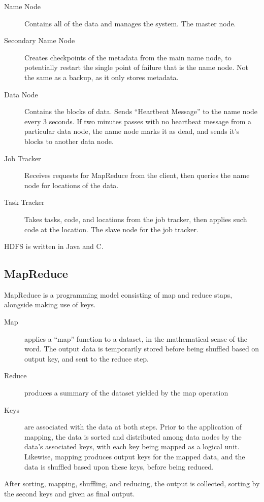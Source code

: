 \documentclass[10pt,a4paper]{article}
\begin{document}
\begin{description}
\item[Name Node] Contains all of the data and manages the system. The
  master node.
  \item[Secondary Name Node] Creates checkpoints of the metadata from
  the main name node, to potentially restart the single point of
  failure that is the name node. Not the same as a backup, as it only
  stores metadata.
\item[Data Node] Contains the blocks of data. Sends ``Heartbeat
  Message'' to the name node every 3 seconds. If two minutes passes
  with no heartbeat message from a particular data node, the name node
  marks it as dead, and sends it's blocks to another data node.
\item[Job Tracker] Receives requests for MapReduce from the client,
  then queries the name node for locations of the data.
\item[Task Tracker] Takes tasks, code, and locations from the job
  tracker, then applies such code at the location. The slave node for
  the job tracker.
\end{description}

HDFS is written in Java and C.

\subsection{MapReduce}
\label{sec:mapreduce}

MapReduce is a programming model consisting of map and reduce staps,
alongside making use of keys.

\begin{description}
\item[Map] applies a ``map'' function to a dataset, in the
  mathematical sense of the word. The output data is temporarily
  stored before being shuffled based on output key, and sent to the
  reduce step.
\item[Reduce] produces a summary of the dataset yielded by the map operation
\item[Keys] are associated with the data at both steps. Prior to the
  application of mapping, the data is sorted and distributed among
  data nodes by the data's associated keys, with each key being mapped
  as a logical unit. Likewise, mapping produces output keys for the
  mapped data, and the data is shuffled based upon these keys, before
  being reduced.
\end{description}

After sorting, mapping, shuffling, and reducing, the output is
collected, sorting by the second keys and given as final output.
\end{document}
